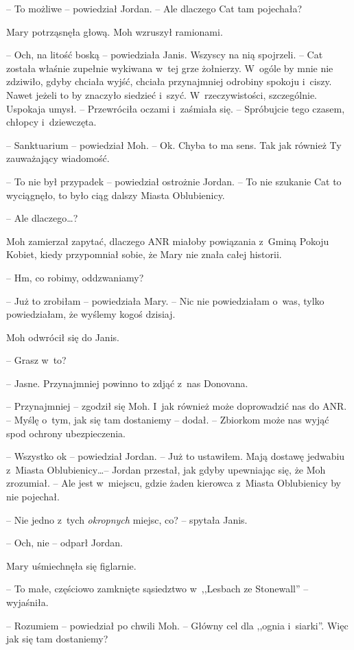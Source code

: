 \documentclass[oneside,polish,11pt,sfheadings]{mwbk}
\begin{document}
-- To możliwe -- powiedział Jordan. -- Ale dlaczego Cat tam pojechała?

Mary potrząsnęła głową. Moh wzruszył ramionami.

-- Och, na litość boską -- powiedziała Janis. Wszyscy na nią spojrzeli. -- Cat została właśnie zupełnie wykiwana w~tej grze żołnierzy. W~ogóle by
mnie nie zdziwiło, gdyby chciała wyjść, chciała przynajmniej odrobiny
spokoju i~ciszy. Nawet jeżeli to by znaczyło siedzieć i~szyć. W~rzeczywistości, szczególnie. Uspokaja umysł. -- Przewróciła oczami i~zaśmiała się. -- Spróbujcie tego czasem, chłopcy i~dziewczęta.

-- Sanktuarium -- powiedział Moh. -- Ok. Chyba to ma sens. Tak jak również
Ty zauważający wiadomość.

-- To nie był przypadek -- powiedział ostrożnie Jordan. -- To nie szukanie
Cat to wyciągnęło, to było ciąg dalszy Miasta Oblubienicy.

-- Ale dlaczego\ldots?

Moh zamierzał zapytać, dlaczego ANR miałoby powiązania z~Gminą Pokoju
Kobiet, kiedy przypomniał sobie, że Mary nie znała całej historii. 

-- Hm,
co robimy, oddzwaniamy?

-- Już to zrobiłam -- powiedziała Mary. -- Nic nie powiedziałam o~was,
tylko powiedziałam, że wyślemy kogoś dzisiaj.

Moh odwrócił się do Janis. 

-- Grasz w~to?

-- Jasne. Przynajmniej powinno to zdjąć z~nas Donovana.

-- Przynajmniej -- zgodził się Moh. I~jak również może doprowadzić nas do
ANR. -- Myślę o~tym, jak się tam dostaniemy -- dodał. -- Zbiorkom może nas
wyjąć spod ochrony ubezpieczenia.

-- Wszystko ok -- powiedział Jordan. -- Już to ustawiłem. Mają dostawę
jedwabiu z~Miasta Oblubienicy\ldots -- Jordan przestał, jak gdyby upewniając
się, że Moh zrozumiał. -- Ale jest w~miejscu, gdzie żaden kierowca z~Miasta Oblubienicy by nie pojechał.

-- Nie jedno z~tych \emph{okropnych} miejsc, co? -- spytała Janis.

-- Och, nie -- odparł Jordan.

Mary uśmiechnęła się figlarnie. 

-- To małe, częściowo zamknięte
sąsiedztwo w~,,Lesbach ze Stonewall'' -- wyjaśniła.

-- Rozumiem -- powiedział po chwili Moh. -- Główny cel dla ,,ognia i~siarki''. Więc jak się tam dostaniemy?
\end{document}
